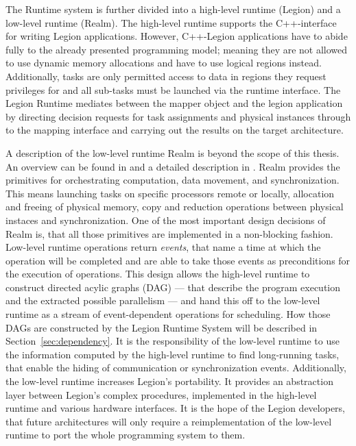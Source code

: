 \documentclass{article}      %
\begin{document}
The Runtime system is further divided into a high-level runtime (Legion) and a low-level runtime (Realm). The high-level runtime supports the C++-interface for writing Legion applications. However, C++-Legion applications have to abide fully to the already presented programming model;
meaning they are not allowed to use dynamic memory allocations and have to use logical regions instead. Additionally, tasks are only permitted access to data in regions they request privileges for and all sub-tasks must be launched via the runtime interface. 
The Legion Runtime mediates between the mapper object and the legion application by directing decision requests for task assignments and physical instances through to the mapping interface and carrying out the results on the target architecture.

A description of the low-level runtime Realm is beyond the scope of this thesis. 
An overview can be found in \cite{Realm} and a detailed description in \cite{TreichlerThesis}. 
Realm provides the primitives for orchestrating computation, data movement, and synchronization. 
This means launching tasks on specific processors remote or locally, allocation and freeing of physical memory, copy and reduction operations between physical instaces and synchronization. One of the most important design decisions of Realm is, that all those primitives are implemented in a non-blocking fashion. 
Low-level runtime operations return \emph{events}, that name a time at which the operation will be completed and are able to take those events as preconditions for the execution of operations. 
This design allows the high-level runtime to construct directed acylic graphs (DAG) --- that describe the program execution and the extracted possible parallelism --- and hand this off to the low-level runtime as a stream of event-dependent operations for scheduling. How those DAGs are constructed by the Legion Runtime System will be described in Section~\ref{sec:dependency}.
It is the responsibility of the low-level runtime to use the information computed by the high-level runtime to find long-running tasks, that enable the hiding of communication or synchronization events. 
Additionally, the low-level runtime increases Legion's portability. 
It provides an abstraction layer between Legion's complex procedures, implemented in the high-level runtime and various hardware interfaces. 
It is the hope of the Legion developers, that future architectures will only require a reimplementation of the low-level runtime to port the whole programming system to them.
\end{document}
